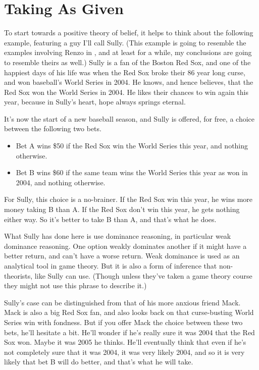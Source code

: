 \documentclass[11pt,]{book}
\providecommand{\tightlist}{%
  \setlength{\itemsep}{0pt}\setlength{\parskip}{0pt}}
\begin{document}
\hypertarget{given}{%
\section{Taking As Given}\label{given}}

To start towards a positive theory of belief, it helps to think about the following example, featuring a guy I'll call Sully. (This example is going to resemble the examples involving Renzo in \citet{RossSchroeder2014}, and at least for a while, my conclusions are going to resemble theirs as well.) Sully is a fan of the Boston Red Sox, and one of the happiest days of his life was when the Red Sox broke their 86 year long curse, and won baseball's World Series in 2004. He knows, and hence believes, that the Red Sox won the World Series in 2004. He likes their chances to win again this year, because in Sully's heart, hope always springs eternal.

It's now the start of a new baseball season, and Sully is offered, for free, a choice between the following two bets.

\begin{itemize}
\tightlist
\item
  Bet A wins \$50 if the Red Sox win the World Series this year, and nothing otherwise.
\item
  Bet B wins \$60 if the same team wins the World Series this year as won in 2004, and nothing otherwise.
\end{itemize}

For Sully, this choice is a no-brainer. If the Red Sox win this year, he wins more money taking B than A. If the Red Sox don't win this year, he gets nothing either way. So it's better to take B than A, and that's what he does.

What Sully has done here is use dominance reasoning, in particular weak dominance reasoning. One option weakly dominates another if it might have a better return, and can't have a worse return. Weak dominance is used as an analytical tool in game theory. But it is also a form of inference that non-theorists, like Sully can use. (Though unless they've taken a game theory course they might not use this phrase to describe it.)

Sully's case can be distinguished from that of his more anxious friend Mack. Mack is also a big Red Sox fan, and also looks back on that curse-busting World Series win with fondness. But if you offer Mack the choice between these two bets, he'll hesitate a bit. He'll wonder if he's really sure it was 2004 that the Red Sox won. Maybe it was 2005 he thinks. He'll eventually think that even if he's not completely sure that it was 2004, it was very likely 2004, and so it is very likely that bet B will do better, and that's what he will take.
\end{document}
